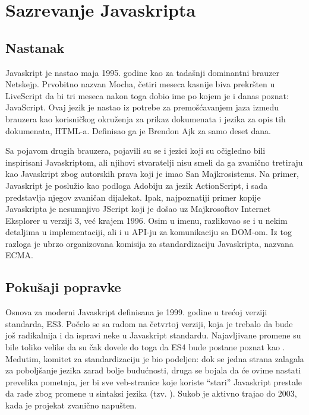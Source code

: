 \section{Sazrevanje Javaskripta}

\subsection{Nastanak}

Javaskript je nastao maja 1995. godine kao  za tadašnji dominantni brauzer Netskejp.
Prvobitno nazvan Mocha, četiri meseca kasnije biva prekršten u LiveScript da bi tri meseca nakon toga dobio ime po kojem je i danas poznat: JavaScript.
Ovaj jezik je nastao iz potrebe za premošćavanjem jaza izmedu brauzera kao korisničkog okruženja za prikaz dokumenata i jezika za opis tih dokumenata, HTML-a. 
Definisao ga je Brendon Ajk za samo deset dana.

Sa pojavom drugih brauzera, pojavili su se i jezici koji su očigledno bili inspirisani Javaskriptom, ali njihovi stvaratelji nisu smeli da ga zvanično tretiraju kao Javaskript zbog autorskih prava koji je imao San Majkrosistems.
Na primer, Javaskript je poslužio kao podloga Adobiju za jezik ActionScript, i sada predstavlja njegov zvaničan dijalekat.
Ipak, najpoznatiji primer kopije Javaskripta je nesumnjivo JScript koji je došao uz Majkrosoftov Internet Eksplorer u verziji 3, već krajem 1996.
Osim u imenu, razlikovao se i u nekim detaljima u implementaciji, ali i u API-ju za komunikaciju sa DOM-om.
Iz tog razloga je ubrzo organizovana komisija za standardizaciju Javaskripta, nazvana ECMA.

\subsection{Pokušaji popravke}

Osnova za moderni Javaskript definisana je 1999. godine u trećoj verziji standarda, ES3.
Počelo se sa radom na četvrtoj verziji, koja je trebalo da bude još radikalnija i da ispravi neke  u Javaskript standardu.
Najavljivane promene su bile toliko velike da su čak dovele do toga da ES4 bude postane poznat kao .
Medutim, komitet za standardizaciju je bio podeljen: dok se jedna strana zalagala za poboljšanje jezika zarad bolje budućnosti, druga se bojala da će ovime nastati prevelika pometnja, jer bi sve veb-stranice koje koriste “stari” Javaskript prestale da rade zbog promene u sintaksi jezika (tzv. ).
Sukob je aktivno trajao do 2003, kada je projekat zvanično napušten.


